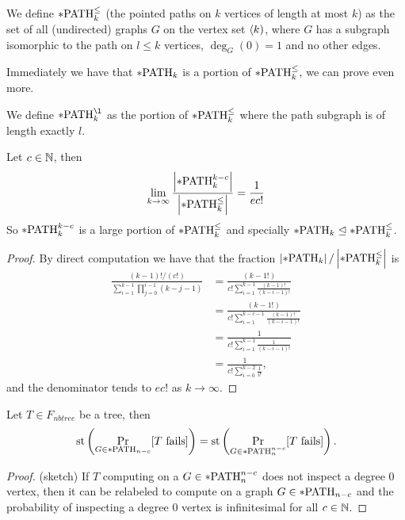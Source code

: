 \begin{defi}
We define $*\text{PATH}^\leq_k$ (the pointed paths on $k$ vertices of length at most $k$) as the set of all (undirected) graphs $G$ on the vertex set $\langle k)$, where $G$ has a subgraph isomorphic to the path on $l\leq k$ vertices, $\deg_G(0)=1$ and no other edges.
\end{defi}

Immediately we have that $*\text{PATH}_k$ is a portion of $*\text{PATH}^\leq_k,$ we can prove even more.

\begin{defi}
We define $\pPATH_k^{\l}$ as the portion of $*\text{PATH}^\leq_k$ where the path subgraph is of length exactly $l$. 
\end{defi}


\begin{lemm}
Let $c\in \mathbb{N}$, then 
\[\lim_{k\to\infty}\frac{\left|{*\text{PATH}_k^{k-c}}\right|}{\left|{*\text{PATH}^\leq_k}\right|}=\frac{1}{ec!}\]
So $*\text{PATH}_k^{k-c}$ is a large portion of $*\text{PATH}^\leq_k$ and specially $*\text{PATH}_k\trianglelefteq *\text{PATH}^\leq_k$.
\end{lemm}
\begin{proof}
By direct computation we have that the fraction $\left|{*\text{PATH}_k}\right|/\left|{*\text{PATH}^\leq_k}\right|$ is
\begin{align}
\frac{(k-1)!/(c!)}{\sum_{i=1}^{k-1}\prod_{j=0}^{i-1}(k-j-1)}&=\frac{(k-1!)}{c!\sum_{i=1}^{k-1}\frac{(k-1)!}{(k-i-1)!}}\\
&=\frac{(k-1!)}{c!\sum_{i=1}^{k-c-1}\frac{(k-1)!}{(k-i-1)!}}\\
&=\frac{1}{c!\sum_{i=1}^{k-1}\frac{1}{(k-i-1)!}}\\
&=\frac{1}{c!\sum_{i=0}^{k-2}\frac{1}{i!}},
\end{align}
and the denominator tends to $ec!$ as $k\to\infty$.
\end{proof}

\begin{lemm}\label{lemmpathnnc}
Let $T\in F_{nbtree}$ be a tree, then
\[\text{st}\left(\Pr_{G\in*\text{PATH}_{n-c}}[\text{$T$ fails}]\right )=\text{st}\left(\Pr_{G\in*\text{PATH}_{n}^{n-c}}[\text{$T$ fails}]\right).\]
\end{lemm}
\begin{proof}(sketch)
If $T$ computing on a $G\in*\text{PATH}_n^{n-c}$ does not inspect a degree 0 vertex, then it can be relabeled to compute on a graph $G\in*\text{PATH}_{n-c}$ and the probability of inspecting a degree 0 vertex is infinitesimal for all $c\in \mathbb{N}$.
\end{proof}

